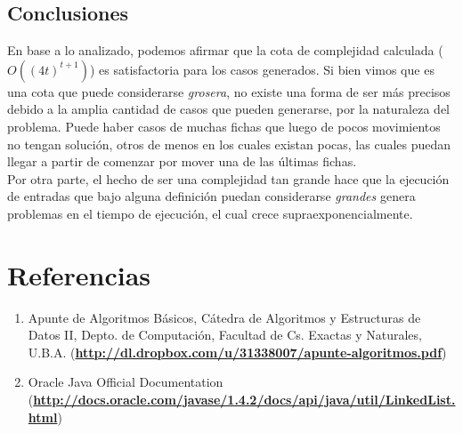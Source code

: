 \documentclass[10pt, a4paper,english,spanish]{article}
\begin{document}
\subsection{Conclusiones}

En base a lo analizado, podemos afirmar que la cota de complejidad calculada ($O((4t)^{t+1})$) es satisfactoria para los casos generados. 
Si bien vimos que es una cota que puede considerarse \textit{grosera}, no existe una forma de ser más precisos
debido a la amplia cantidad de casos que pueden generarse, por la naturaleza del problema. Puede haber casos
de muchas fichas que luego de pocos movimientos no tengan solución, otros de menos en los cuales existan 
pocas, las cuales puedan llegar a partir de comenzar por mover una de las últimas fichas. \\
\indent Por otra parte, el hecho de ser una complejidad tan grande hace que la ejecución de entradas que bajo alguna definición
puedan considerarse \textit{grandes} genera problemas en el tiempo de ejecución, el cual crece supraexponencialmente.

\newpage

\section{Referencias}
\begin{enumerate}
  \item Apunte de Algoritmos Básicos, Cátedra de Algoritmos y Estructuras de Datos II, Depto. de Computación,
    Facultad de Cs. Exactas y Naturales, U.B.A. (\textbf{\url{http://dl.dropbox.com/u/31338007/apunte-algoritmos.pdf}})
  \item Oracle Java Official Documentation \\ (\textbf{\url{http://docs.oracle.com/javase/1.4.2/docs/api/java/util/LinkedList.html}})
\end{enumerate}
\end{document}
